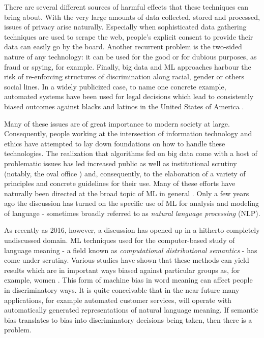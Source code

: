 \documentclass{article}
\begin{document}
There are several different sources of harmful effects that these techniques can bring about. With the very large amounts of data collected, stored and processed, issues of privacy arise naturally. Especially when sophisticated data gathering techniques are used to scrape the web, people's explicit consent to provide their data can easily go by the board. Another recurrent problem is the two-sided nature of any technology: it can be used for the good or for dubious purposes, as fraud or spying, for example. Finally, big data and ML approaches harbour the risk of re-enforcing structures of discrimination along racial, gender or others social lines. In a widely publicized case, to name one concrete example, automated systems have been used for legal decisions which lead to consistently biased outcomes against blacks and latinos in the United States of America \cite{angwin2016machine}.

Many of these issues are of great importance to modern society at large. Consequently, people working at the intersection of information technology and ethics have attempted to lay down foundations on how to handle these technologies. The realization that algorithms fed on big data come with a host of problematic issues has led increased public as well as institutional scrutiny (notably, the oval office \cite{united2014big}) and, consequently, to the elaboration of a variety of principles and concrete guidelines for their use. Many of these efforts have naturally been directed at the broad topic of ML in general \cite{leidner2017ehtical}. Only a few years ago the discussion has turned on the specific use of ML for analysis and modeling of language - sometimes broadly referred to as \emph{natural language processing} (NLP).

As recently as 2016, however, a discussion has opened up in a hitherto completely undiscussed domain. ML techniques used for the computer-based study of language meaning - a field known as \emph{computational distributional semantics} - has come under scrutiny.
Various studies have shown that these methods can  yield results which are in important ways biased against particular groups as, for example, women \cite{google} \cite{wagner2015s}.
This form of machine bias in word meaning can affect people in discriminatory ways. It is quite conceivable that in the near future many applications, for example automated customer services, will operate with automatically generated representations of natural language meaning. If semantic bias translates to bias into discriminatory decisions being taken, then there is a problem.
\end{document}
